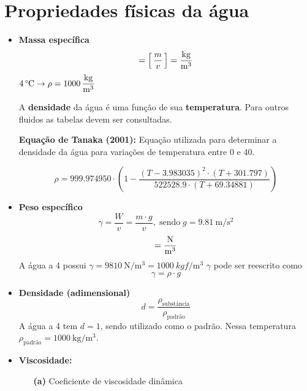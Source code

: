 \documentclass[
	a4paper, 
	12pt, 
	brazilian
]{article}
\begin{document}
	\section{Propriedades físicas da água}
	
	\begin{itemize}
		\item\textbf{Massa específica}
			\begin{equation}
				[\,\rho\,]=\left[\,\dfrac{m}{v}\,\right]=\SI{}{\dfrac{\kilogram}{\meter^{3}}}
			\end{equation}
			$\SI{4}{\SIUnitSymbolCelsius}\rightarrow\rho=\SI{1000}{\dfrac{\kilogram}{\meter^{3}}}$
			
			A \textbf{densidade} da água é uma função de sua \textbf{temperatura}. Para outros fluidos as tabelas devem ser consultadas.	
			
			\textbf{Equação de Tanaka (2001):}
			Equação utilizada para determinar a densidade da água para variações de temperatura entre \SI{0}{\SIUnitSymbolCelsius} e \SI{40}{\SIUnitSymbolCelsius}.
			
			\begin{equation}
			\rho=999.974950\cdot\left(1-\dfrac{(T-3.983035)^{2}\cdot(T+301.797)}{522528.9\cdot (T+69.34881)}\right)
			\end{equation}	
		\item\textbf{Peso específico}
			\begin{equation}
				\gamma=\dfrac{W}{v}=\dfrac{m\cdot g}{v},\;\textrm{sendo}\;g=\SI{9.81}{\meter/\second^{2}}
			\end{equation}
			\begin{equation}
				[\,\gamma\,]=\SI{}{\dfrac{\newton}{\meter^{3}}}
			\end{equation}	
			A água a \SI{4}{\SIUnitSymbolCelsius} possui $\gamma=\SI{9810}{\newton/\meter^{3}}=\SI{1000}{kgf/\meter^{3}}$
			$\gamma$ pode ser reescrito como
			\begin{equation}
				\gamma=\rho\cdot g
			\end{equation}
		\item\textbf{Densidade (adimensional)}
		\begin{equation}
			d=\dfrac{\rho_{\textrm{substância}}}{\rho_{\textrm{padrão}}}
		\end{equation}
		A água a \SI{4}{\SIUnitSymbolCelsius} tem $d=1$, sendo utilizado como o padrão. Nessa temperatura $\rho_{\textrm{padrão}}=\SI{1000}{\kilogram/\meter^{3}}$.
		
		\item\textbf{Viscosidade:}
		\begin{itemize}
			\item[\textbf{(a)}] Coeficiente de viscosidade dinâmica
			

\end{itemize}
\end{itemize}
\end{document}
